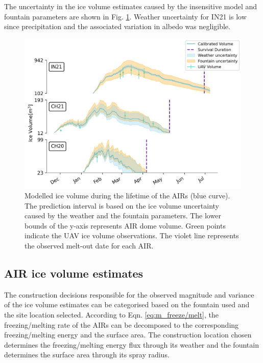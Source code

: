 \documentclass[utf8]{frontiersSCNS} %
\begin{document}
The uncertainty in the ice volume estimates caused by the insensitive model and fountain parameters are shown in Fig.
\ref{fig:results}. Weather uncertainty for IN21 is low since precipitation and the associated variation in albedo
was negligible.

\begin{figure}
	\begin{center}
		\includegraphics[width=\linewidth]{Figures/icev_results.jpg}
	\end{center}
	\caption{Modelled ice volume during the lifetime of the AIRs (blue curve). The prediction interval is based on the
		ice volume uncertainty caused by the weather and the fountain parameters. The lower bounds of the y-axis
		represents AIR dome volume. Green points indicate the UAV ice volume observations.  The violet line represents the
		observed melt-out date for each AIR.  }

	\label{fig:results}
\end{figure}

\subsection{AIR ice volume estimates}

The construction decisions responsible for the observed magnitude and variance of the ice volume estimates can be
categorised based on the fountain used and the site location selected. According to Eqn. \ref{eq:m_freeze/melt}, the
freezing/melting rate of the AIRs can be decomposed to the corresponding freezing/melting energy and the surface
area. The construction location chosen determines the freezing/melting energy flux through its weather and the
fountain determines the surface area through its spray radius.
\end{document}
